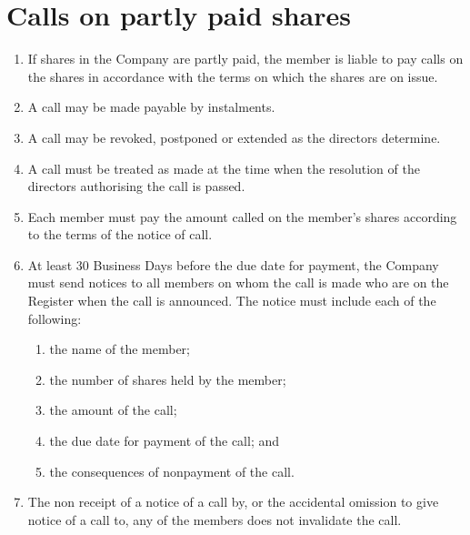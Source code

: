 \section{Calls on partly paid shares}

\begin{enumerate}[label=(\alph*)]
    \item If shares in the Company are partly paid, the member is liable to pay calls on the shares in accordance with the terms on which the shares are on issue.
    
    \item A call may be made payable by instalments.
    
    \item A call may be revoked, postponed or extended as the directors determine.
    
    \item A call must be treated as made at the time when the resolution of the directors authorising the call is passed.
    
    \item Each member must pay the amount called on the member's shares according to the terms of the notice of call.
    
    \item At least 30 Business Days before the due date for payment, the Company must send notices to all members on whom the call is made who are on the Register when the call is announced. The notice must include each of the following:
    \begin{enumerate}[label=(\roman*)]
        \item the name of the member;
        \item the number of shares held by the member;
        \item the amount of the call;
        \item the due date for payment of the call; and
        \item the consequences of nonpayment of the call.
    \end{enumerate}
    
    \item The non receipt of a notice of a call by, or the accidental omission to give notice of a call to, any of the members does not invalidate the call.
    

\end{enumerate}
